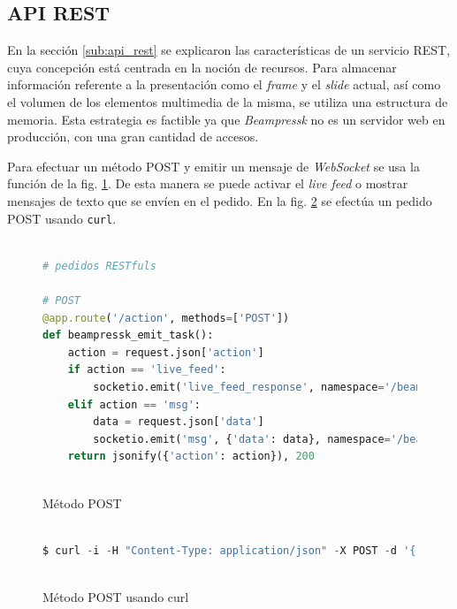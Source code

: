 		

		\subsection{API REST} %
		\label{sub:api_rest_imp}
			En la sección \ref{sub:api_rest} se explicaron las características de un servicio REST, cuya concepción está centrada en la noción de recursos. Para almacenar información referente a la presentación como el \textit{frame} y el \textit{slide} actual, así como el volumen de los elementos multimedia de la misma, se utiliza una estructura de memoria. Esta estrategia es factible ya que \textit{Beampressk} no es un servidor web en producción, con una gran cantidad de accesos.

			Para efectuar un método POST y emitir un mensaje de \textit{WebSocket} se usa la función de la fig. \ref{fig:post_method}. De esta manera se puede activar el \textit{live feed} o mostrar mensajes de texto que se envíen en el pedido. En la fig. \ref{fig:curl_post} se efectúa un pedido POST usando \texttt{curl}.

			\begin{figure}[htb]%
				\begin{lstlisting}[language=Python]%

# pedidos RESTfuls

# POST
@app.route('/action', methods=['POST'])
def beampressk_emit_task():
    action = request.json['action']
    if action == 'live_feed':
        socketio.emit('live_feed_response', namespace='/beampressk')
    elif action == 'msg':
        data = request.json['data']
        socketio.emit('msg', {'data': data}, namespace='/beampressk')
    return jsonify({'action': action}), 200  
  
				\end{lstlisting}
			\caption{Método POST}
			\label{fig:post_method}
			\end{figure}			

			\begin{figure}[htb]%
				\begin{lstlisting}[language=Python]%

$ curl -i -H "Content-Type: application/json" -X POST -d '{"action":"msg", "data":"Este es un mensaje de texto"}' http://beampressk.com:5000/action
  
				\end{lstlisting}
			\caption{Método POST usando curl}
			\label{fig:curl_post}
			\end{figure}
			
